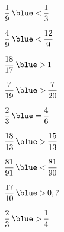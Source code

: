    \begin{colenumerate}{3}
      \item $\dfrac{1}{9} \, {\blue <} \, \dfrac{1}{3}$ \bigskip
      \item $\dfrac{4}{9} \, {\blue <} \,\dfrac{12}{9}$ \bigskip
      \item $\dfrac{18}{17} \, {\blue >} \,1$
      \item $\dfrac{7}{19} \, {\blue >} \,\dfrac{7}{20}$
      \item $\dfrac{2}{3} \, {\blue =} \,\dfrac{4}{6}$
      \item $\dfrac{18}{13} \, {\blue >} \,\dfrac{15}{13}$
      \item $\dfrac{81}{91} \, {\blue <} \,\dfrac{81}{90}$
      \item $\dfrac{17}{10} \, {\blue >} \,0,7$
      \item $\dfrac{2}{3} \, {\blue >} \,\dfrac{1}{4}$
   \end{colenumerate}

